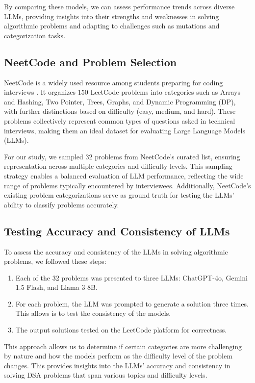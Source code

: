 \documentclass[times, 10pt,twocolumn]{article}
\begin{document}
By comparing these models, we can assess performance trends across diverse LLMs, providing insights into their strengths and weaknesses in solving algorithmic problems and adapting to challenges such as mutations and categorization tasks.

\subsection{NeetCode and Problem Selection}
NeetCode is a widely used resource among students preparing for coding interviews \cite{neetcode}. It organizes 150 LeetCode problems into categories such as Arrays and Hashing, Two Pointer, Trees, Graphs, and Dynamic Programming (DP), with further distinctions based on difficulty (easy, medium, and hard). These problems collectively represent common types of questions asked in technical interviews, making them an ideal dataset for evaluating Large Language Models (LLMs).

For our study, we sampled 32 problems from NeetCode's curated list, ensuring representation across multiple categories and difficulty levels. This sampling strategy enables a balanced evaluation of LLM performance, reflecting the wide range of problems typically encountered by interviewees. Additionally, NeetCode's existing problem categorizations serve as ground truth for testing the LLMs' ability to classify problems accurately.

\subsection{Testing Accuracy and Consistency of LLMs}
To assess the accuracy and consistency of the LLMs in solving algorithmic problems, we followed these steps:

\begin{enumerate}
    \item Each of the 32 problems was presented to three LLMs: ChatGPT-4o, Gemini 1.5 Flash, and Llama 3 8B.
    \item For each problem, the LLM was prompted to generate a solution three times. This allows is to test the consistency of the models.
    \item The output solutions tested on the LeetCode platform for correctness.
\end{enumerate}

This approach allows us to determine if certain categories are more challenging by nature and how the models perform as the difficulty level of the problem changes. This provides insights into the LLMs' accuracy and consistency in solving DSA problems that span various topics and difficulty levels.
\end{document}
